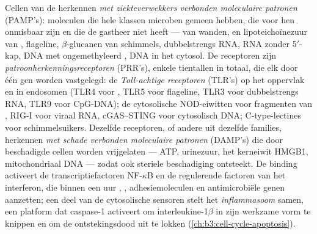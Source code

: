\begin{definition}[Patroonherkenning]\label{def:b3:innate-immunity:prr}
Cellen van de  herkennen \emph{met ziekteverwekkers
verbonden moleculaire patronen} (PAMP's): moleculen die hele klassen
microben gemeen hebben, die voor hen onmisbaar zijn en die de gastheer
niet heeft ---  van  wanden,
 en lipoteichoïnezuur van , flageline,
$\beta$-glucanen van schimmels, dubbelstrengs RNA, RNA zonder
5$'$-kap, DNA met ongemethyleerd , DNA in het cytosol. De receptoren
zijn \emph{patroonherkenningsreceptoren} (PRR's), enkele tientallen in
totaal, die elk door één gen worden vastgelegd: de \emph{Toll-achtige
receptoren} (TLR's) op het oppervlak en in endosomen (TLR4 voor
, TLR5 voor flageline, TLR3 voor dubbelstrengs RNA,
TLR9 voor CpG-DNA); de cytosolische NOD-eiwitten voor fragmenten van
, RIG-I voor viraal RNA, cGAS--STING voor cytosolisch
DNA; C-type-lectines voor schimmelsuikers. Dezelfde receptoren, of
andere uit dezelfde families, herkennen \emph{met schade verbonden
moleculaire patronen} (DAMP's) die door beschadigde cellen worden
vrijgelaten --- ATP, urinezuur, het kerneiwit HMGB1, mitochondriaal DNA
--- zodat ook steriele beschadiging ontsteekt. De binding activeert de
transcriptiefactoren NF-$\kappa$B en de regulerende factoren van het
interferon, die binnen een uur , , adhesiemoleculen
en antimicrobiële genen aanzetten; een deel van de cytosolische
sensoren stelt het \emph{inflammasoom} samen, een platform dat
caspase-1 activeert om interleukine-1$\beta$ in zijn werkzame vorm te
knippen en om de ontstekingsdood  uit te lokken
(\cref{ch:b3:cell-cycle-apoptosis}).
\end{definition}

